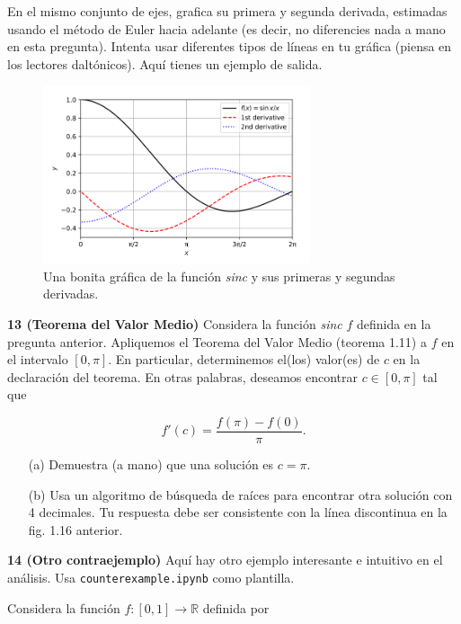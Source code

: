 \documentclass{article}
\begin{document}
En el mismo conjunto de ejes, grafica su primera y segunda derivada, estimadas usando el método de Euler hacia adelante (es decir, no diferencies nada a mano en esta pregunta). Intenta usar diferentes tipos de líneas en tu gráfica (piensa en los lectores daltónicos). Aquí tienes un ejemplo de salida.

\begin{figure}[h]
    \centering
    \includegraphics[width=0.7\textwidth]{pictures/sinc.png}
    \caption{Una bonita gráfica de la función \textit{sinc} y sus primeras y segundas derivadas.}
    \label{fig:sinc_derivadas}
\end{figure}


\textbf{13 (Teorema del Valor Medio)} Considera la función \textit{sinc} \(f\) definida en la pregunta anterior. Apliquemos el Teorema del Valor Medio (teorema 1.11) a \(f\) en el intervalo \([0, \pi]\). En particular, determinemos el(los) valor(es) de \(c\) en la declaración del teorema. En otras palabras, deseamos encontrar \(c \in [0, \pi]\) tal que

\[
f'(c) = \frac{f(\pi) - f(0)}{\pi}.
\]

\begin{itemize}
    \item[(a)] Demuestra (a mano) que una solución es \(c = \pi\).
    
    \item[(b)] Usa un algoritmo de búsqueda de raíces para encontrar otra solución con 4 decimales.  
    Tu respuesta debe ser consistente con la línea discontinua en la fig. 1.16 anterior.
\end{itemize}

\textbf{14 (Otro contraejemplo)} Aquí hay otro ejemplo interesante e intuitivo en el análisis. Usa \texttt{counterexample.ipynb} como plantilla.

Considera la función \(f : [0, 1] \to \mathbb{R}\) definida por
\end{document}
